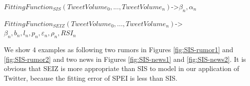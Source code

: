  
$FittingFunction_{SIS}(TweetVolume_{0},...,TweetVolume_{n})$->$\beta_{n},\alpha_{n}$%


$FittingFunction_{SEIZ}(TweetVolume_{0},...,TweetVolume_{n})$->$\beta_{n},b_{n},l_{n},p_{n},\varepsilon_{n},\rho_{n},RSI_{n}$


 We show 4 examples as following two rumors in Figures \ref{fig:SIS-rumor1} and \ref{fig:SIS-rumor2} and two news in Figures \ref{fig:SIS-news1} and \ref{fig:SIS-news2}. It is obvious that SEIZ is more appropriate than SIS to model in our application of Twitter, because the fitting error of SPEI is less than SIS. 


\begin{figure}[!h]

  \centering

\end{figure}
